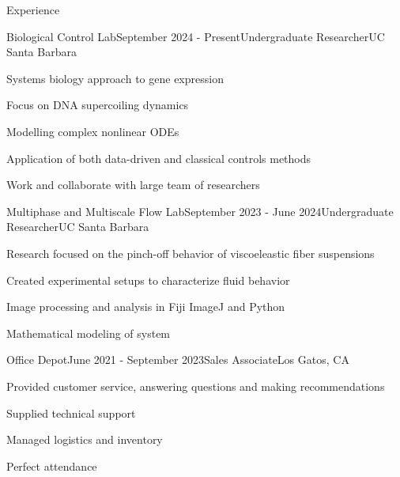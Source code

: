 \documentclass[
	11pt, %
]{resume} %
\begin{document}
\begin{rSection}{Experience}

	\begin{rSubsection}{Biological Control Lab}{September 2024 - Present}{Undergraduate Researcher}{UC Santa Barbara}
		\item Systems biology approach to gene expression
		\item Focus on DNA supercoiling dynamics
		\item Modelling complex nonlinear ODEs
		\item Application of both data-driven and classical controls methods
		\item Work and collaborate with large team of researchers
	\end{rSubsection}


	\begin{rSubsection}{Multiphase and Multiscale Flow Lab}{September 2023 - June 2024}{Undergraduate Researcher}{UC Santa Barbara}
		\item Research focused on the pinch-off behavior of viscoeleastic fiber suspensions
		\item Created experimental setups to characterize fluid behavior
		\item Image processing and analysis in Fiji ImageJ and Python
		\item Mathematical modeling of system
	\end{rSubsection}


	\begin{rSubsection}{Office Depot}{June 2021 - September 2023}{Sales Associate}{Los Gatos, CA}
		\item Provided customer service, answering questions and making recommendations
		\item Supplied technical support 
		\item Managed logistics and inventory
		\item Perfect attendance
	\end{rSubsection}

\end{rSection}

\end{document}
